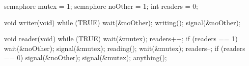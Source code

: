 \documentclass[varwidth=28em,crop]{standalone}
\begin{document}
\begin{minipage}{.42\linewidth}
\vspace{1em}
\begin{ccode}
semaphore mutex = 1;
semaphore noOther = 1;
int readers = 0;

void writer(void)
{
  while (TRUE) {
    wait(&noOther);
      writing();
    signal(&noOther);
  }
}        
\end{ccode}
\end{minipage}\qquad
\begin{minipage}{.48\linewidth}
\vspace{1em}
\begin{ccode}
void reader(void)
{
  while (TRUE) {
    wait(&mutex);
      readers++;
      if (readers == 1)
         wait(&noOther);
    signal(&mutex);
    reading();
    wait(&mutex);
      readers--;
      if (readers == 0)
        signal(&noOther);
    signal(&mutex);
    anything();
  }
}      
\end{ccode} 
\end{minipage}
\end{document}
